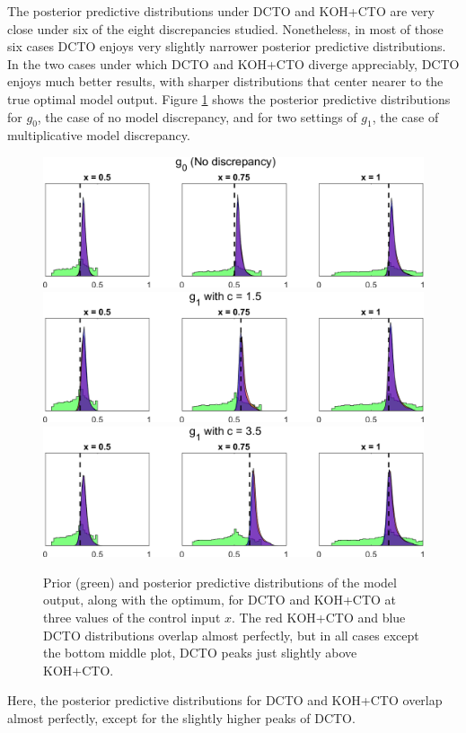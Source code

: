 \documentclass[12pt]{article}
\begin{document}
%
The posterior predictive distributions under DCTO and KOH+CTO are very close under six of the eight discrepancies studied.
%
Nonetheless, in most of those six cases DCTO enjoys very slightly narrower posterior predictive distributions. 
%
In the two cases under which DCTO and KOH+CTO diverge appreciably, DCTO enjoys much better results, with sharper distributions that center nearer to the true optimal model output.
%
Figure \ref{fig:01_post_dist} shows the posterior predictive distributions for $g_0$, the case of no model discrepancy, and for two settings of $g_1$, the case of multiplicative model discrepancy.
%
\begin{figure}
	\centering
	\includegraphics[scale=0.85]{FIG_DCTO_KOHCTO_post_pred_dist_discrep0}\\
	\vspace{1em}
	\includegraphics[scale=0.85]{FIG_DCTO_KOHCTO_post_pred_dist_discrep1}\\
	\vspace{1em}
	\includegraphics[scale=0.85]{FIG_DCTO_KOHCTO_post_pred_dist_discrep2}
	\captionsetup{width=.85\linewidth}
	\caption{Prior (green) and posterior predictive distributions of the model output, along with the optimum, for DCTO and KOH+CTO at three values of the control input $x$. The red KOH+CTO and blue DCTO distributions overlap almost perfectly, but in all cases except the bottom middle plot, DCTO peaks just slightly above KOH+CTO.}
	\label{fig:01_post_dist}
\end{figure}
%
Here, the posterior predictive distributions for DCTO and KOH+CTO overlap almost perfectly, except for the slightly higher peaks of DCTO.
%
\end{document}
